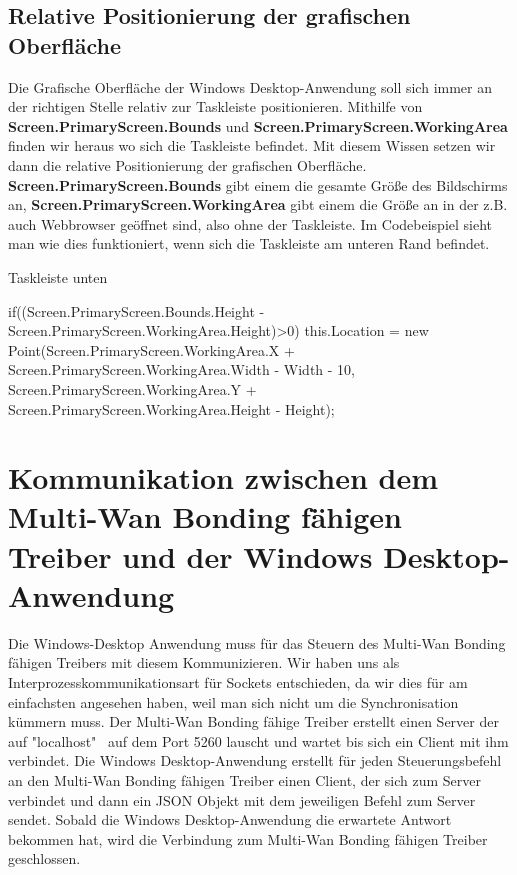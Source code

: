 \subsection{Relative Positionierung der grafischen Oberfläche}
Die Grafische Oberfläche der Windows Desktop-Anwendung soll sich immer an der richtigen Stelle relativ zur Taskleiste positionieren. Mithilfe von \textbf{Screen.PrimaryScreen.Bounds} und \textbf{Screen.PrimaryScreen.WorkingArea} finden wir heraus wo sich die Taskleiste befindet. Mit diesem Wissen setzen wir dann die relative Positionierung der grafischen Oberfläche. \textbf{Screen.PrimaryScreen.Bounds} gibt einem die gesamte Größe des Bildschirms an, \textbf{Screen.PrimaryScreen.WorkingArea} gibt einem die Größe an in der z.B. auch Webbrowser geöffnet sind, also ohne der  Taskleiste. Im Codebeispiel sieht man wie dies funktioniert, wenn sich die Taskleiste am unteren Rand befindet.
\begin{program}[H]
\caption{Taskleiste unten}
\begin{CSharpCode}
if((Screen.PrimaryScreen.Bounds.Height - Screen.PrimaryScreen.WorkingArea.Height)>0)
{
    this.Location = new Point(Screen.PrimaryScreen.WorkingArea.X + 
      Screen.PrimaryScreen.WorkingArea.Width - Width - 10, 
      Screen.PrimaryScreen.WorkingArea.Y + Screen.PrimaryScreen.WorkingArea.Height 
      - Height);
}
\end{CSharpCode}
\end{program}
\noindent

\section{Kommunikation zwischen dem Multi-Wan Bonding fähigen Treiber und der Windows Desktop-Anwendung}
Die Windows-Desktop Anwendung muss für das Steuern des Multi-Wan Bonding fähigen Treibers mit diesem Kommunizieren. Wir haben uns als Interprozesskommunikationsart für Sockets entschieden, da wir dies für am einfachsten angesehen haben, weil man sich nicht um die Synchronisation kümmern muss. Der Multi-Wan Bonding fähige Treiber erstellt einen Server der auf "localhost" \ auf dem Port 5260 lauscht und wartet bis sich ein Client mit ihm verbindet. Die Windows Desktop-Anwendung erstellt für jeden Steuerungsbefehl an den Multi-Wan Bonding fähigen Treiber einen Client, der sich zum Server verbindet und dann ein JSON Objekt mit dem jeweiligen Befehl zum Server sendet. Sobald die Windows Desktop-Anwendung die erwartete Antwort bekommen hat, wird die Verbindung zum Multi-Wan Bonding fähigen Treiber geschlossen.


